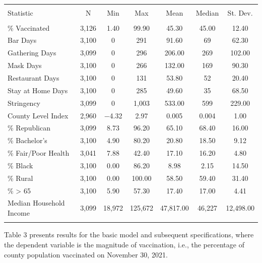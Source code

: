\documentclass[
]{article}
\begin{document}
\begin{table}[!htbp] \centering 
  \caption{} 
  \label{} 
\begin{tabular}{@{\extracolsep{5pt}}lcccccc} 
\\[-1.8ex]\hline 
\hline \\[-1.8ex] 
Statistic & \multicolumn{1}{c}{N} & \multicolumn{1}{c}{Min} & \multicolumn{1}{c}{Max} & \multicolumn{1}{c}{Mean} & \multicolumn{1}{c}{Median} & \multicolumn{1}{c}{St. Dev.} \\ 
\hline \\[-1.8ex] 
\% Vaccinated & 3,126 & 1.40 & 99.90 & 45.30 & 45.00 & 12.40 \\ 
Bar Days & 3,100 & 0 & 291 & 91.60 & 69 & 62.30 \\ 
Gathering Days & 3,099 & 0 & 296 & 206.00 & 269 & 102.00 \\ 
Mask Days & 3,100 & 0 & 266 & 132.00 & 169 & 90.30 \\ 
Restaurant Days & 3,100 & 0 & 131 & 53.80 & 52 & 20.40 \\ 
Stay at Home Days & 3,100 & 0 & 285 & 49.60 & 35 & 68.50 \\ 
Stringency & 3,099 & 0 & 1,003 & 533.00 & 599 & 229.00 \\ 
County Level Index & 2,960 & $-$4.32 & 2.97 & 0.005 & 0.004 & 1.00 \\ 
\% Republican & 3,099 & 8.73 & 96.20 & 65.10 & 68.40 & 16.00 \\ 
\% Bachelor's & 3,100 & 4.90 & 80.20 & 20.80 & 18.50 & 9.12 \\ 
\% Fair/Poor Health & 3,041 & 7.88 & 42.40 & 17.10 & 16.20 & 4.80 \\ 
\% Black & 3,100 & 0.00 & 86.20 & 8.98 & 2.15 & 14.50 \\ 
\% Rural & 3,100 & 0.00 & 100.00 & 58.50 & 59.40 & 31.40 \\ 
\% > 65 & 3,100 & 5.90 & 57.30 & 17.40 & 17.00 & 4.41 \\ 
Median Household Income & 3,099 & 18,972 & 125,672 & 47,817.00 & 46,227 & 12,498.00 \\ 
\hline \\[-1.8ex] 
\end{tabular} 
\end{table}

Table 3 presents results for the basic model and subsequent
specifications, where the dependent variable is the magnitude of
vaccination, i.e., the percentage of county population vaccinated on
November 30, 2021.
\end{document}
